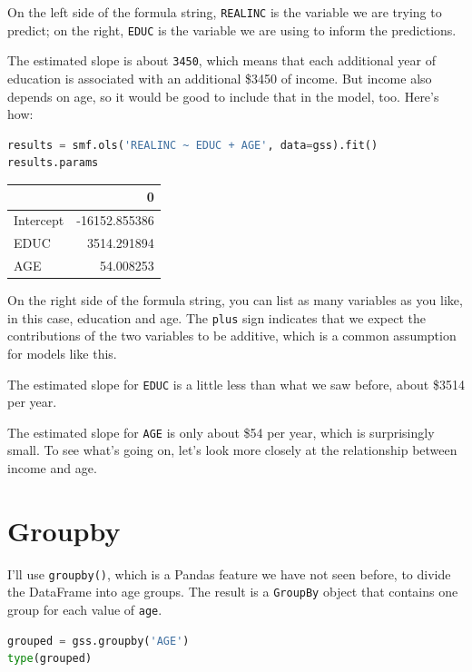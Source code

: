 On the left side of the formula string,
\passthrough{\lstinline!REALINC!} is the variable we are trying to
predict; on the right, \passthrough{\lstinline!EDUC!} is the variable we
are using to inform the predictions.

The estimated slope is about \passthrough{\lstinline!3450!}, which means
that each additional year of education is associated with an additional
\$3450 of income. But income also depends on age, so it would be good to
include that in the model, too. Here's how:

\begin{lstlisting}[language=Python,style=source]
results = smf.ols('REALINC ~ EDUC + AGE', data=gss).fit()
results.params
\end{lstlisting}

\begin{tabular}{lr}
\toprule
{} &             0 \\
\midrule
Intercept & -16152.855386 \\
EDUC      &   3514.291894 \\
AGE       &     54.008253 \\
\bottomrule
\end{tabular}

On the right side of the formula string, you can list as many variables
as you like, in this case, education and age. The
\passthrough{\lstinline!plus!} sign indicates that we expect the
contributions of the two variables to be additive, which is a common
assumption for models like this.

The estimated slope for \passthrough{\lstinline!EDUC!} is a little less
than what we saw before, about \$3514 per year.

The estimated slope for \passthrough{\lstinline!AGE!} is only about \$54
per year, which is surprisingly small. To see what's going on, let's
look more closely at the relationship between income and age.

\hypertarget{groupby}{%
\section{Groupby}\label{groupby}}

I'll use \passthrough{\lstinline!groupby()!}, which is a Pandas feature
we have not seen before, to divide the DataFrame into age groups. The
result is a \passthrough{\lstinline!GroupBy!} object that contains one
group for each value of \passthrough{\lstinline!age!}.

\begin{lstlisting}[language=Python,style=source]
grouped = gss.groupby('AGE')
type(grouped)
\end{lstlisting}


